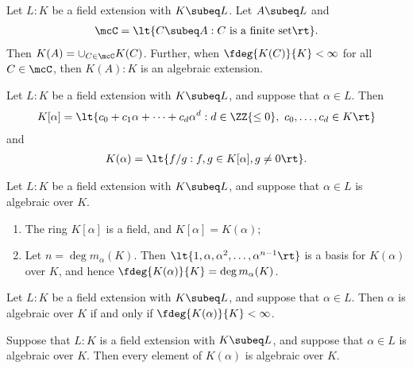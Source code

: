 \documentclass{article}
\begin{document}
  \begin{tproposition}
    Let \( L:K \) be a field extension with \( K\subeq L \).
    Let \( A\subeq L \) and \begin{align*}
      \mcC=\lt\{ C\subeq A : C \text{ is a finite set} \rt\}.
    \end{align*}
    Then \( K(A)=\cup_{C\in\mcC}K(C) \).
    Further, when \( \fdeg{K(C)}{K}<\infty \) for all \( C\in \mcC \), then \( K(A):K \) is an algebraic extension.
  \end{tproposition}

  \begin{tproposition}
    Let \( L : K \) be a field extension with \( K \subeq L \), and suppose that \( \alpha\in L \).
    Then \begin{align*}
      K[\alpha] = \lt\{ c_0 + c_1\alpha+\cdots+c_d \alpha^d : d\in \ZZ{\leq 0},\ c_0,\ldots,c_d\in K \rt\}
    \end{align*}
    and \begin{align*}
      K(\alpha) = \lt\{ f/g : f,g\in K[\alpha], g\neq 0 \rt\}.
    \end{align*}
  \end{tproposition}

  \begin{ttheorem}
    Let \( L : K \) be a field extension with \( K \subeq L \), and suppose that \( \alpha\in L \) is algebraic over \( K \).
    \begin{enumerate}[label=(\roman*)]
      \item The ring \( K[\alpha] \) is a field, and \( K[\alpha] = K(\alpha) \);
      \item Let \( n=\deg m_\alpha(K) \).
        Then \( \lt\{ 1,\alpha,\alpha^2,\ldots,\alpha^{n-1} \rt\} \) is a basis for \( K(\alpha) \) over \( K \), and hence \( \fdeg{K(\alpha)}{K}=\deg m_\alpha(K) \).
    \end{enumerate}
  \end{ttheorem}

  \begin{tproposition}
    Let \( L : K \) be a field extension with \( K \subeq L \), and suppose that \( \alpha\in L \).
    Then \( \alpha \) is algebraic over \( K \) if and only if \( \fdeg{K(\alpha)}{K}<\infty \).
  \end{tproposition}

  \begin{tproposition}
    Suppose that \( L : K \) is a field extension with \( K \subeq L \), and suppose that \( \alpha\in L \) is algebraic over \( K \).
    Then every element of \( K(\alpha) \) is algebraic over \( K \).
  \end{tproposition}
\end{document}

